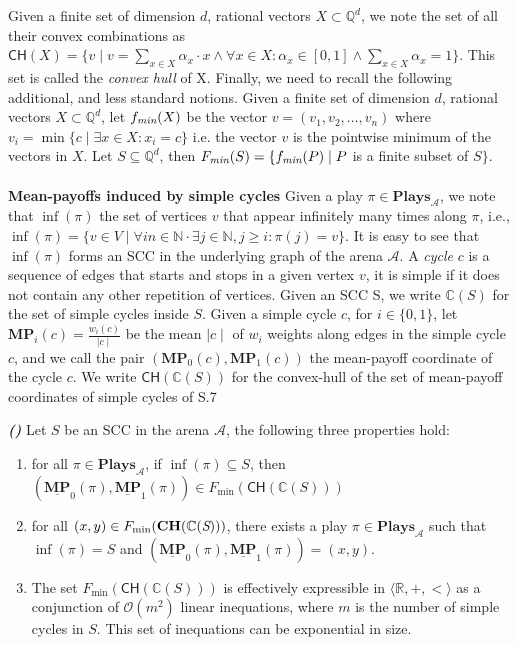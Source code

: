 Given a finite set of dimension $d$, rational vectors $X \subset \mathbb{Q}^d$, we note the set of all their convex combinations as $\mathsf{CH}(X) = \{v \mid v = \sum_{x \in X} \alpha_x\cdot x \land \forall x \in X: \alpha_x \in [0,1] \land \sum_{x \in X}\alpha_x = 1\}$. This set is called the \textit{convex hull} of X. Finally, we need to recall the following additional, and less standard notions. Given a finite set of dimension $d$, rational vectors $X \subset \mathbb{Q}^d$, let $f_{\emph{min}}(X)$ be the vector $v = (v_1, v_2, \dots , v_n)$ where $v_i = \min \{c \mid \exists x \in X: x_i = c \}$ i.e. the vector $v$ is the pointwise minimum of the vectors in $X$. Let $S \subseteq \mathbb{Q}^d$, then $F_{\emph{min}}(S) = \{ f_{\emph{min}}(P) \mid P $ is a finite subset of $S\}$.
\\
\\
\textbf{Mean-payoffs induced by simple cycles} Given a play $\pi \in \mathbf{Plays}_{\mathcal{A}}$, we note that $\inf(\pi)$ the set of vertices $v$ that appear infinitely many times along $\pi$, i.e., $\inf(\pi) = \{v \in V \mid \forall in \in \mathbb{N}\cdot \exists j \in \mathbb{N}, j \geqslant i: \pi(j) = v \}$. It is easy to see that $\inf(\pi)$ forms an SCC in the underlying graph of the arena $\mathcal{A}$. A \textit{cycle} $c$ is a sequence of edges that starts and stops in a given vertex $v$, it is simple if it does not contain any other repetition of vertices. Given an SCC S, we write $\mathbb{C}(S)$ for the set of simple cycles inside $S$. Given a simple cycle $c$, for $i \in \{0,1\}$, let $\mathbf{MP}_i(c) = \frac{w_i(c)}{\mid c \mid}$ be the mean $\mid c \mid$ of $w_i$ weights along edges in the simple cycle $c$, and we call the pair $(\mathbf{MP}_0(c), \mathbf{MP}_1(c))$ the mean-payoff coordinate of the cycle $c$. We write $\mathsf{CH}(\mathbb{C}(S))$ for the convex-hull of the set of mean-payoff coordinates of simple cycles of S.7

\begin{lemma}
\label{lemCHToPlay}
\textbf{\emph{(\cite{FGR20,CDEHR10})}} Let $S$ be an SCC in the arena $\mathcal{A}$, the following three properties hold:
\begin{enumerate}
    \item for all $\pi \in \mathbf{Plays}_{\mathcal{A}}$, if $\inf(\pi) \subseteq S$, then $(\underline{\mathbf{MP}}_0(\pi), \underline{\mathbf{MP}}_1(\pi)) \in F_{\min}(\mathsf{CH}(\mathbb{C}(S)))$
    \item for all $(x,y) \in F_{\min}(\mathbf{CH}(\mathbb{C}(\emph{S})))$, there exists a play $\pi \in \mathbf{Plays}_{\mathcal{A}}$ such that $\inf(\pi) = S$ and $(\underline{\mathbf{MP}}_0(\pi), \underline{\mathbf{MP}}_1(\pi)) = (x,y)$.
    \item The set $F_{\min}(\mathsf{CH}(\mathbb{C}(S)))$ is effectively expressible in $\langle \mathbb{R}, +, < \rangle$ as a conjunction of $\mathcal{O}(m^2)$ linear inequations, where $m$ is the number of simple cycles in $S$. This set of inequations can be exponential in size.
\end{enumerate}
\end{lemma}

